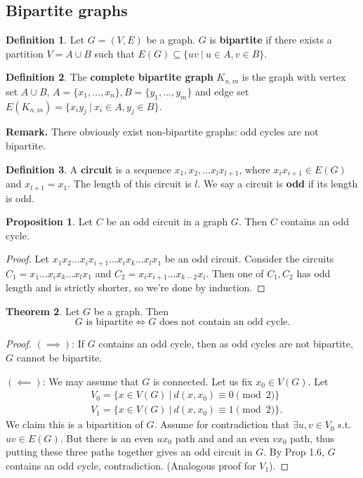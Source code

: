 \documentclass{article}
\theoremstyle{definition}
\newtheorem{theorem}{Theorem}[section]
\newtheorem{prop}[theorem]{Proposition}
\newtheorem{defn}{Definition}[section]
\begin{document}
\subsection{Bipartite graphs}

\begin{defn}
    Let $G = (V,E)$ be a graph. $G$ is \textbf{bipartite} if there exists a partition $V = A \cup B$ such that $E(G) \subseteq \{uv ~|~ u \in A, v \in B\}$.
\end{defn}
\begin{defn}
    The \textbf{complete bipartite graph} $K_{n,m}$ is the graph with vertex set $A \cup B$, $A = \{x_1,\ldots,x_n\}, B = \{y_1,\ldots,y_m\}$ and edge set $E(K_{n,m}) = \{x_iy_j ~|~ x_i \in A, y_j \in B\}$.
\end{defn}

\textbf{Remark.} There obviously exist non-bipartite graphs: odd cycles are not bipartite.

\begin{defn}
    A \textbf{circuit} is a sequence $x_1,x_2,\ldots x_l x_{l+1}$, where $x_ix_{i+1} \in E(G)$ and $x_{l+1}=x_1$. The length of this circuit is $l$. We say a circuit is \textbf{odd} if its length is odd.
\end{defn}
\begin{prop}
    Let $C$ be an odd circuit in a graph $G$. Then $C$ contains an odd cycle.
\end{prop}

\begin{proof}
    Let $x_1 x_2 \ldots x_i x_{i+1} \ldots x_i x_k \ldots x_lx_1$ be an odd circuit. Consider the circuits $C_1 = x_1\ldots x_i x_k \ldots x_l x_1$ and $C_2 = x_i x_{i+1} \ldots x_{k-2} x_i$. Then one of $C_1, C_2$ has odd length and is strictly shorter, so we're done by induction.
\end{proof}

\begin{theorem}
    Let $G$ be a graph. Then \[
    G \text{ is bipartite} \iff G \text{ does not contain an odd cycle}.
    \]
\end{theorem}
\begin{proof}
    $(\implies )$: If $G$ contains an odd cycle, then as odd cycles are not bipartite, $G$ cannot be bipartite.

    $(\impliedby)$: We may assume that $G$ is connected. Let us fix $x_0 \in V(G)$. Let 
    \begin{align*}
        &V_0 = \{x \in V(G) ~|~ d(x,x_0) \equiv 0 \pmod{2}\}\\ 
        &V_1 = \{x \in V(G) ~|~ d(x,x_0) \equiv 1 \pmod{2}\}.
    \end{align*}
    We claim this is a bipartition of $G$. Assume for contradiction that $\exists u,v \in V_0$ s.t. $uv \in E(G)$. But there is an even $ux_0$ path and and an even $vx_0$ path, thus putting these three paths together gives an odd circuit in $G$. By Prop 1.6, $G$ contains an odd cycle, contradiction. (Analogous proof for $V_1$).
\end{proof}
\end{document}
